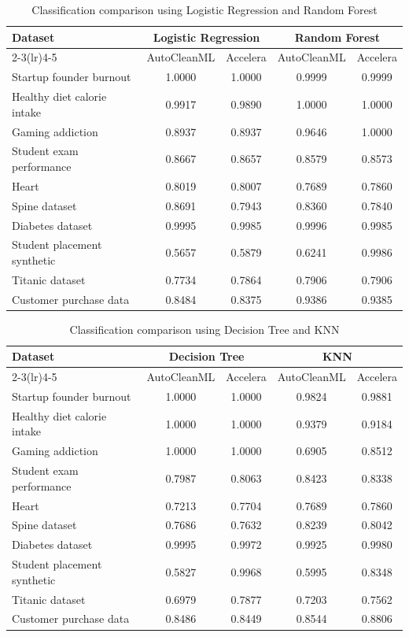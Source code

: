 \documentclass[12pt,a4paper,oneside]{report}
\begin{document}
\begin{table}[H]
\centering
\small
\caption{Classification comparison using Logistic Regression and Random Forest}
\label{tab:classification-lr-rf-autoclean-accelera}
\begin{tabular}{p{}cccc}
\toprule
Dataset & \multicolumn{2}{c}{Logistic Regression} & \multicolumn{2}{c}{Random Forest} \\
\cmidrule(lr){2-3}\cmidrule(lr){4-5}
 & AutoCleanML & Accelera & AutoCleanML & Accelera \\
\midrule
Startup founder burnout & 1.0000 & 1.0000 & 0.9999 & 0.9999 \\
Healthy diet calorie intake & 0.9917 & 0.9890 & 1.0000 & 1.0000 \\
Gaming addiction & 0.8937 & 0.8937 & 0.9646 & 1.0000 \\
Student exam performance & 0.8667 & 0.8657 & 0.8579 & 0.8573 \\
Heart & 0.8019 & 0.8007 & 0.7689 & 0.7860 \\
Spine dataset & 0.8691 & 0.7943 & 0.8360 & 0.7840 \\
Diabetes dataset & 0.9995 & 0.9985 & 0.9996 & 0.9985 \\
Student placement synthetic & 0.5657 & 0.5879 & 0.6241 & 0.9986 \\
Titanic dataset & 0.7734 & 0.7864 & 0.7906 & 0.7906 \\
Customer purchase data & 0.8484 & 0.8375 & 0.9386 & 0.9385 \\
\bottomrule
\end{tabular}
\end{table}

\begin{table}[H]
\centering
\small
\caption{Classification comparison using Decision Tree and KNN}
\label{tab:classification-dt-knn-autoclean-accelera}
\begin{tabular}{p{}cccc}
\toprule
Dataset & \multicolumn{2}{c}{Decision Tree} & \multicolumn{2}{c}{KNN} \\
\cmidrule(lr){2-3}\cmidrule(lr){4-5}
 & AutoCleanML & Accelera & AutoCleanML & Accelera \\
\midrule
Startup founder burnout & 1.0000 & 1.0000 & 0.9824 & 0.9881 \\
Healthy diet calorie intake & 1.0000 & 1.0000 & 0.9379 & 0.9184 \\
Gaming addiction & 1.0000 & 1.0000 & 0.6905 & 0.8512 \\
Student exam performance & 0.7987 & 0.8063 & 0.8423 & 0.8338 \\
Heart & 0.7213 & 0.7704 & 0.7689 & 0.7860 \\
Spine dataset & 0.7686 & 0.7632 & 0.8239 & 0.8042 \\
Diabetes dataset & 0.9995 & 0.9972 & 0.9925 & 0.9980 \\
Student placement synthetic & 0.5827 & 0.9968 & 0.5995 & 0.8348 \\
Titanic dataset & 0.6979 & 0.7877 & 0.7203 & 0.7562 \\
Customer purchase data & 0.8486 & 0.8449 & 0.8544 & 0.8806 \\
\bottomrule
\end{tabular}
\end{table}
\end{document}
